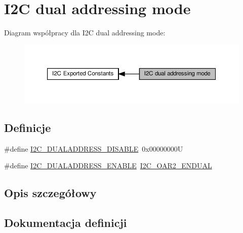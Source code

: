 \hypertarget{group___i2_c__dual__addressing__mode}{}\section{I2C dual addressing mode}
\label{group___i2_c__dual__addressing__mode}
Diagram współpracy dla I2C dual addressing mode\+:\nopagebreak
\begin{figure}[H]
\begin{center}
\leavevmode
\includegraphics[width=350pt]{group___i2_c__dual__addressing__mode}
\end{center}
\end{figure}
\subsection*{Definicje}
\begin{DoxyCompactItemize}
\item 
\#define \hyperlink{group___i2_c__dual__addressing__mode_gacb8f4a1fd543e5ef2c9e7711fc9b5a67}{I2\+C\+\_\+\+D\+U\+A\+L\+A\+D\+D\+R\+E\+S\+S\+\_\+\+D\+I\+S\+A\+B\+LE}~0x00000000U
\item 
\#define \hyperlink{group___i2_c__dual__addressing__mode_gae33ff5305d9f38d857cff1774f481fab}{I2\+C\+\_\+\+D\+U\+A\+L\+A\+D\+D\+R\+E\+S\+S\+\_\+\+E\+N\+A\+B\+LE}~\hyperlink{group___peripheral___registers___bits___definition_gab83ed1ee64439cb2734a708445f37e94}{I2\+C\+\_\+\+O\+A\+R2\+\_\+\+E\+N\+D\+U\+AL}
\end{DoxyCompactItemize}


\subsection{Opis szczegółowy}


\subsection{Dokumentacja definicji}
\mbox{\label{group___i2_c__dual__addressing__mode_gacb8f4a1fd543e5ef2c9e7711fc9b5a67}} 
